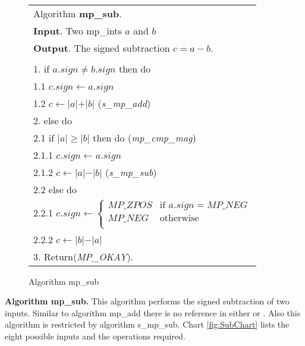 \documentclass[b5paper]{book}
\begin{document}
\newpage\begin{figure}[!here]
\begin{center}
\begin{tabular}{l}
\hline Algorithm \textbf{mp\_sub}. \\
\textbf{Input}.   Two mp\_ints $a$ and $b$  \\
\textbf{Output}.  The signed subtraction $c = a - b$. \\
\hline \\
1.  if $a.sign \ne b.sign$ then do \\
\hspace{3mm}1.1  $c.sign \leftarrow a.sign$ \\
\hspace{3mm}1.2  $c \leftarrow \vert a \vert + \vert b \vert$ (\textit{s\_mp\_add}) \\
2.  else do \\
\hspace{3mm}2.1  if $\vert a \vert \ge \vert b \vert$ then do (\textit{mp\_cmp\_mag}) \\
\hspace{6mm}2.1.1  $c.sign \leftarrow a.sign$ \\
\hspace{6mm}2.1.2  $c \leftarrow \vert a \vert  - \vert b \vert$ (\textit{s\_mp\_sub}) \\
\hspace{3mm}2.2  else do \\
\hspace{6mm}2.2.1  $c.sign \leftarrow  \left \lbrace \begin{array}{ll}
                              MP\_ZPOS &  \mbox{if }a.sign = MP\_NEG \\
                              MP\_NEG  &  \mbox{otherwise} \\
                              \end{array} \right .$ \\
\hspace{6mm}2.2.2  $c \leftarrow \vert b \vert  - \vert a \vert$ \\
3.  Return(\textit{MP\_OKAY}). \\
\hline
\end{tabular}
\end{center}
\caption{Algorithm mp\_sub}
\end{figure}

\textbf{Algorithm mp\_sub.}
This algorithm performs the signed subtraction of two inputs.  Similar to algorithm mp\_add there is no reference in either \cite{TAOCPV2} or 
\cite{HAC}.  Also this algorithm is restricted by algorithm s\_mp\_sub.  Chart \ref{fig:SubChart} lists the eight possible inputs and
the operations required.
\end{document}
